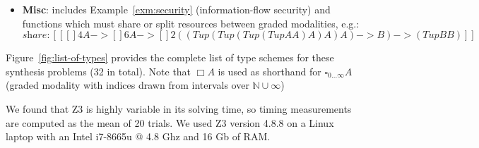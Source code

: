 \begin{itemize}[itemsep=0em,leftmargin=1.1em]
\item \textbf{Misc}: includes Example~\ref{exm:security}
  (information-flow security) and  functions which must share or split resources
between graded modalities, e.g.:
%
\begin{equation*}
\!\!
\textit{share}: [[ {{[] 4 A} -> {{[] 6 A} -> {[] 2 {({(Tup {(Tup {(Tup {(Tup A A)} A)} A)} A)} ->
    B)} }}} -> {(Tup B B)}  ]]
\end{equation*}
%
\end{itemize}
%
Figure~\ref{fig:list-of-types} provides the complete list of type schemes for
these synthesis problems (32 in total). Note that $\Box A$ is used as 
shorthand for $\square_{0...\infty} A$ (graded modality with indices drawn
from intervals over $\mathbb{N} \cup \infty$) 

We found that Z3 is highly variable in its solving time, so timing
measurements are computed as the mean of 20 trials. We used
Z3 version 4.8.8 on a Linux laptop with an Intel i7-8665u @ 4.8 Ghz
and 16 Gb of RAM.

